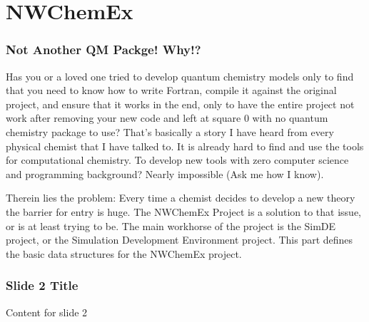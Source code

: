 \section{NWChemEx}

\begin{frame}
\sectionpage
\end{frame}

\begin{frame}
\frametitle{Not Another QM Packge! Why!?}
Has you or a loved one tried to develop quantum chemistry models only to find
that you need to know how to write Fortran, compile it against the original
project, and ensure that it works in the end, only to have the entire project
not work after removing your new code and left at square 0 with no quantum
chemistry package to use? That's basically a story I have heard from every
physical chemist that I have talked to. It is already hard to find and use
the tools for computational chemistry. To develop new tools with zero computer
science and programming background? Nearly impossible (Ask me how I know).
\end{frame}

\begin{frame}
Therein lies the problem: Every time a chemist decides to develop a new theory
the barrier for entry is huge. The NWChemEx Project is a solution to that
issue, or is at least trying to be. The main workhorse of the project is the
SimDE project, or the Simulation Development Environment project. This part
defines the basic data structures for the NWChemEx project. 
\end{frame}

\begin{frame}

\end{frame}

\begin{frame}
\frametitle{Slide 2 Title}
Content for slide 2
\end{frame}
